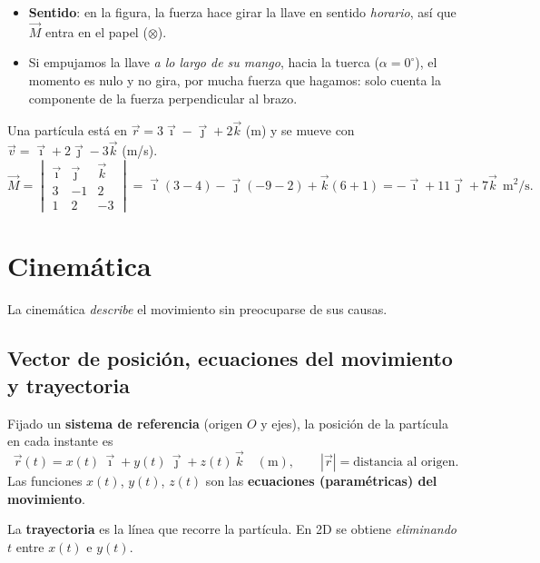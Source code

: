 \documentclass[11pt,a4paper]{article}
\newcommand{\ii}{\vec{\imath}}
\newcommand{\jj}{\vec{\jmath}}
\newcommand{\kk}{\vec{k}}
\begin{document}
\begin{ejemplo}[title={Ejemplo: la llave inglesa (momento de una fuerza)}]
\begin{itemize}[itemsep=2pt]
  \item \textbf{Sentido}: en la figura, la fuerza hace girar la llave en sentido \emph{horario}, así que $\vec M$ entra en el papel ($\otimes$).
  \item Si empujamos la llave \emph{a lo largo de su mango}, hacia la tuerca ($\alpha=0^\circ$), el momento es nulo y no gira, por mucha fuerza que hagamos: solo cuenta la componente de la fuerza perpendicular al brazo.
\end{itemize}
\end{ejemplo}

\begin{ejemplo}[title={Ejemplo: momento de la velocidad}]
Una partícula está en $\vec r=3\ii-\jj+2\kk$ (m) y se mueve con $\vec v=\ii+2\jj-3\kk$ (m/s).
\[
\vec M=\begin{vmatrix}\ii&\jj&\kk\\3&-1&2\\1&2&-3\end{vmatrix}
=\ii(3-4)-\jj(-9-2)+\kk(6+1)=-\ii+11\jj+7\kk\ \ \mathrm{m^2/s}.
\]
\end{ejemplo}

\section{Cinemática}
La cinemática \emph{describe} el movimiento sin preocuparse de sus causas.

\subsection{Vector de posición, ecuaciones del movimiento y trayectoria}
Fijado un \textbf{sistema de referencia} (origen $O$ y ejes), la posición de la partícula en cada instante es
\[
\vec r(t)=x(t)\,\ii+y(t)\,\jj+z(t)\,\kk\quad(\mathrm m),\qquad |\vec r|=\text{distancia al origen}.
\]
Las funciones $x(t)$, $y(t)$, $z(t)$ son las \textbf{ecuaciones (paramétricas) del movimiento}.

La \textbf{trayectoria} es la línea que recorre la partícula. En 2D se obtiene \emph{eliminando $t$} entre $x(t)$ e $y(t)$.
\end{document}
